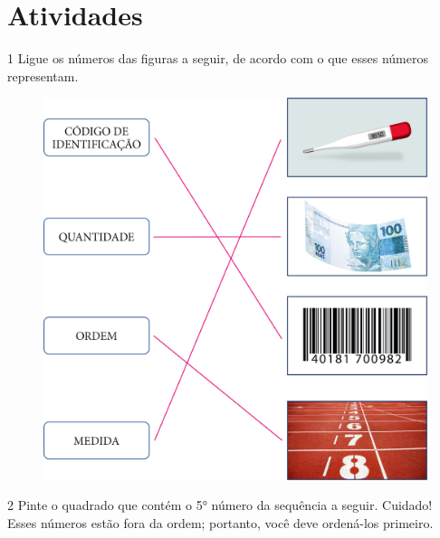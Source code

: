 

\pagebreak
\section*{Atividades}

\num{1} Ligue os números das figuras a seguir, de acordo com o que esses números representam.


\begin{figure}[htpb!]
\centering
\includegraphics[width=.8\textwidth]{./media/image3.png}
\end{figure}


\num{2} Pinte o quadrado que contém o 5° número da sequência a seguir.
Cuidado! Esses números estão fora da ordem; portanto, você deve
ordená-los primeiro.

